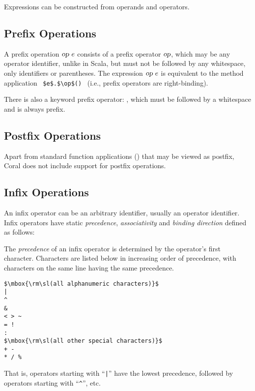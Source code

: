 Expressions can be constructed from operands and operators. 





\subsection{Prefix Operations}

A prefix operation $\mbox{\sl op}\ e$ consists of a prefix operator $\mbox{\sl op}$, which may be any operator identifier, unlike in Scala, but must not be followed by any whitespace, only identifiers or parentheses. The expression $\mbox{\sl op}\ e$ is equivalent to the method application ~\lstinline!$e$.$\op$()!~ (i.e., prefix operators are right-binding). 

There is also a keyword prefix operator: , which must be followed by a whitespace and is always prefix. 





\subsection{Postfix Operations}

Apart from standard function applications () that may be viewed as postfix, Coral does not include support for postfix operations. 





\subsection{Infix Operations}
\label{sec:infix-operations}

An infix operator can be an arbitrary identifier, usually an operator identifier. Infix operators have static {\em precedence}, {\em associativity} and {\em binding direction} defined as follows:

The {\em precedence} of an infix operator is determined by the operator's first character. Characters are listed below in increasing order of precedence, with characters on the same line having the same precedence.

\begin{lstlisting}
$\mbox{\rm\sl(all alphanumeric characters)}$
|
^
&
< > ~
= !
:
$\mbox{\rm\sl(all other special characters)}$
+ -
* / %
\end{lstlisting}

That is, operators starting with ``\lstinline!|!'' have the lowest precedence, followed by operators starting with ``\lstinline!^!'', etc. 

